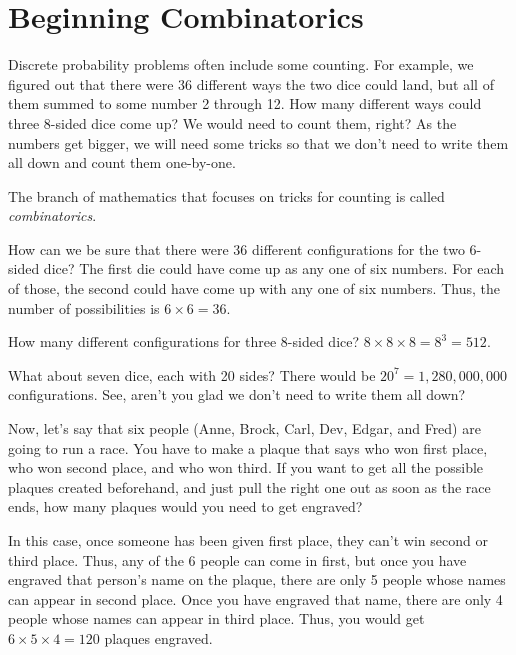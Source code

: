 \chapter{Beginning Combinatorics}

Discrete probability problems often include some counting. For
example, we figured out that there were 36 different ways the two dice could land, 
but all of them summed to some number 2 through 12. How
many different ways could three 8-sided dice come up? We would need to
count them, right? As the numbers get bigger, we will need some tricks so that
we don't need to write them all down and count them one-by-one.

The branch of mathematics that focuses on tricks for counting is
called \textit{combinatorics}.

How can we be sure that there were 36 different configurations for the
two 6-sided dice? The first die could have come up as any one of six
numbers. For each of those, the second could have come up with any one
of six numbers. Thus, the number of possibilities is $ 6 \times 6 =
36.$

How many different configurations for three 8-sided dice?  $8 \times 8
\times 8 = 8^3 = 512$.

What about seven dice, each with 20 sides? There would be $20^7=1,280,000,000$
configurations. See, aren't you glad we don't need to write them all
down?

Now, let's say that six people (Anne, Brock, Carl, Dev, Edgar, and Fred) are
going to run a race. You have to make a plaque that says who won first
place, who won second place, and who won third. If you want to get all
the possible plaques created beforehand, and just pull the right one
out as soon as the race ends, how many plaques would you need to get
engraved?


In this case, once someone has been given first place, they can't win
second or third place. Thus, any of the 6 people can come in first,
but once you have engraved that person's name on the plaque, there are
only 5 people whose names can appear in second place. Once you have
engraved that name, there are only 4 people whose names can appear in
third place. Thus, you would get $6 \times 5 \times 4 = 120$ plaques
engraved.

